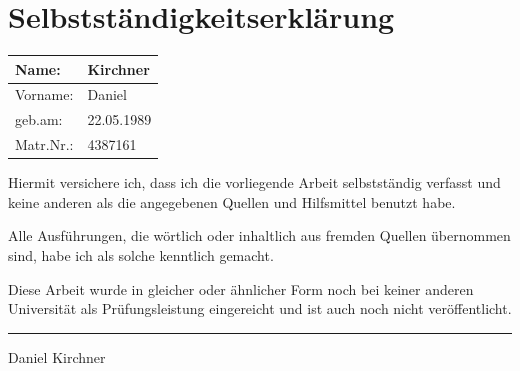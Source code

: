 \documentclass[a4paper,enabledeprecatedfontcommands,abstract=on,twoside=true,bibliography=totoc]{scrreprt}
\numberwithin{TODO}{chapter}
\numberwithin{equation}{section}
\begin{document}
\appendix
{
\setcounter{secnumdepth}{3}

\setcounter{secnumdepth}{3}

\ttfamily
\footnotesize
\parindent0pt


% 
% 
% 
% 
% 
% 
% 
% 
% 
% 
% 
% 
}

\restoregeometry




\cleardoublepage

\chapter*{Selbstst\"andigkeitserkl\"arung}

\begin{center}
\setlength\extrarowheight{4pt}
\begin{tabularx}{\textwidth}{|X|X|}
\hline
Name: & Kirchner \\
\hline
Vorname: & Daniel \\
\hline
geb.am: & 22.05.1989 \\
\hline
Matr.Nr.: & 4387161 \\
\hline
\end{tabularx}
\end{center}

Hiermit versichere ich, dass ich die vorliegende Arbeit selbstst\"andig
verfasst und keine anderen als die angegebenen Quellen und Hilfsmittel
benutzt habe.

Alle Ausf\"uhrungen, die w\"ortlich oder inhaltlich aus fremden Quellen
\"ubernommen sind, habe ich als solche kenntlich gemacht.

Diese Arbeit wurde in gleicher oder \"ahnlicher Form noch bei keiner
anderen Universit\"at als Pr\"ufungsleistung eingereicht und ist auch
noch nicht ver\"offentlicht.

\vspace{50pt}
\noindent\hfill\rule{7cm}{.4pt}\par
   \hfill Daniel Kirchner
\end{document}
